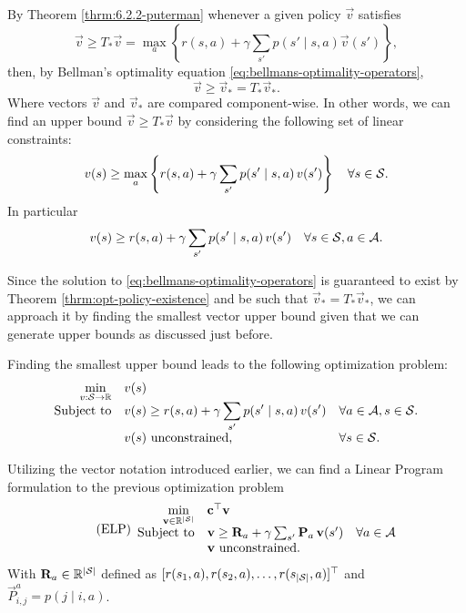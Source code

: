 By Theorem \ref{thrm:6.2.2-puterman} whenever a given policy $\vec{v}$ satisfies
\[
    \vec{v} \geq T_* \vec{v} = \max_{a} \left\{ r(s, a) + \gamma \sum_{s'} p(s' \mid s, a) \vec{v}(s') \right\},
\]
then, by Bellman's optimality equation
\eqref{eq:bellmans-optimality-operators},
\[
    \vec{v} \geq \vec{v}_* = T_* \vec{v}_*.
\]
Where vectors $\vec{v}$ and $\vec{v}_*$ are compared component-wise. In other
words, we can find an upper bound $\vec{v} \geq T_{*} \vec{v}$ by considering
the following set of linear constraints:
\[
    v(s) \geq \max_{a} \left\{ r(s, a) + \gamma \sum_{s'} p(s' \mid s, a) \, v(s') \right\} \quad \forall s \in \mathcal{S}.
\]
In particular
\begin{equation}
    v(s) \geq r(s, a) + \gamma \sum_{s'} p(s' \mid s, a) \, v(s') \quad \forall s \in \mathcal{S}, a \in \mathcal{A}.
\end{equation}

Since the solution to \eqref{eq:bellmans-optimality-operators} is guaranteed to
exist by Theorem \ref{thrm:opt-policy-existence} and be such that $\vec{v}_* =
T_* \vec{v}_*$, we can approach it by finding the smallest vector upper bound
given that we can generate upper bounds as discussed just before.

Finding the smallest upper bound leads to the following optimization problem:
\begin{equation}
\begin{array}{rl@{}ll}
    \displaystyle \min_{v: \States \to \R} & v(s) \\
    \text{Subject to} & \displaystyle v(s) \geq r(s,a) + \gamma \sum_{s'} p(s' \mid s, a) \, v(s') & \quad \forall a \in \Actions, s \in \States. \\
    & v(s) \text{ unconstrained,} & \quad \forall s \in \States.
\end{array}
\end{equation}

Utilizing the vector notation introduced earlier, we can find a Linear Program formulation to the previous optimization problem
\begin{equation}
\label{lp:exact-lp}
\tag{ELP}
\begin{array}{rl@{}ll}
    \displaystyle \min_{\vec{v} \in \R^{|\States|}} & \vec{c}^{\top} \vec{v} \\
    \text{Subject to} & \vec{v} \geq \vec{R}_a + \gamma \sum_{s'} \vec{P}_a \, \vec{v}(s') & \quad \forall a \in \Actions \\
    & \vec{v} \text{ unconstrained.} &
\end{array}
\end{equation}
With $\mathbf{R}_a \in \mathbb{R}^{|\mathcal{S}|}$ defined as $[r(s_1, a), r(s_2, a), \dots,
r(s_{|\mathcal{S}|}, a)]^{\top}$ and $\vec{P}_{i,j}^{a} = p(j \mid i, a)$.

